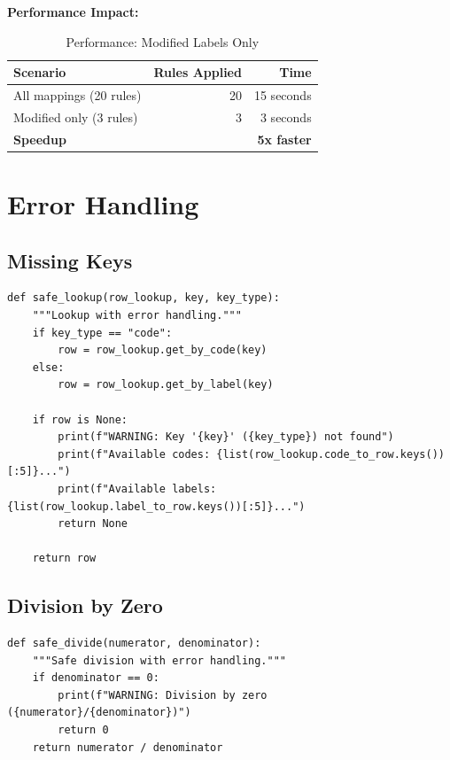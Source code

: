 \textbf{Performance Impact:}

\begin{table}[H]
\centering
\begin{tabular}{lrr}
\toprule
\textbf{Scenario} & \textbf{Rules Applied} & \textbf{Time} \\
\midrule
All mappings (20 rules) & 20 & 15 seconds \\
Modified only (3 rules) & 3 & 3 seconds \\
\midrule
\textbf{Speedup} & & \textbf{5x faster} \\
\bottomrule
\end{tabular}
\caption{Performance: Modified Labels Only}
\end{table}

\section{Error Handling}

\subsection{Missing Keys}

\begin{lstlisting}[style=pythonstyle]
def safe_lookup(row_lookup, key, key_type):
    """Lookup with error handling."""
    if key_type == "code":
        row = row_lookup.get_by_code(key)
    else:
        row = row_lookup.get_by_label(key)
    
    if row is None:
        print(f"WARNING: Key '{key}' ({key_type}) not found")
        print(f"Available codes: {list(row_lookup.code_to_row.keys())[:5]}...")
        print(f"Available labels: {list(row_lookup.label_to_row.keys())[:5]}...")
        return None
    
    return row
\end{lstlisting}

\subsection{Division by Zero}

\begin{lstlisting}[style=pythonstyle]
def safe_divide(numerator, denominator):
    """Safe division with error handling."""
    if denominator == 0:
        print(f"WARNING: Division by zero ({numerator}/{denominator})")
        return 0
    return numerator / denominator
\end{lstlisting}

